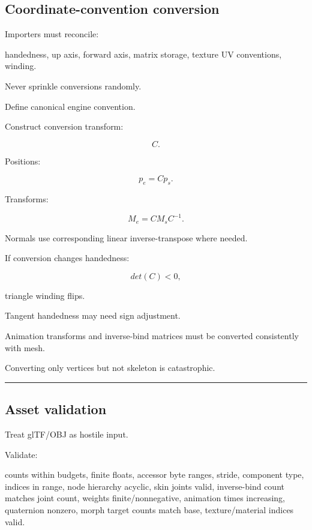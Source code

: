 \subsection{Coordinate-convention conversion}\label{04-visual-computing-ii-ch041-coordinate-convention-conversion}

\hypertarget{04-visual-computing-ii-ch041-coordinate-convention-conversion}{}

Importers must reconcile:

handedness, up axis, forward axis, matrix storage, texture UV conventions, winding.

Never sprinkle conversions randomly.

Define canonical engine convention.

Construct conversion transform:

\[
C.
\]

Positions:

\[
p_e=
Cp_s.
\]

Transforms:

\[
\boxed{
M_e=
CM_sC^{-1}.
}
\]

Normals use corresponding linear inverse-transpose where needed.

If conversion changes handedness:

\[
det(C)<0,
\]

triangle winding flips.

Tangent handedness may need sign adjustment.

Animation transforms and inverse-bind matrices must be converted consistently with mesh.

Converting only vertices but not skeleton is catastrophic.

\begin{center}\rule{0.5\linewidth}{0.5pt}\end{center}

\subsection{Asset validation}\label{04-visual-computing-ii-ch041-asset-validation}

\hypertarget{04-visual-computing-ii-ch041-asset-validation}{}

Treat glTF/OBJ as hostile input.

Validate:

counts within budgets, finite floats, accessor byte ranges, stride, component type, indices in range, node hierarchy acyclic, skin joints valid, inverse-bind count matches joint count, weights finite/nonnegative, animation times increasing, quaternion nonzero, morph target counts match base, texture/material indices valid.

